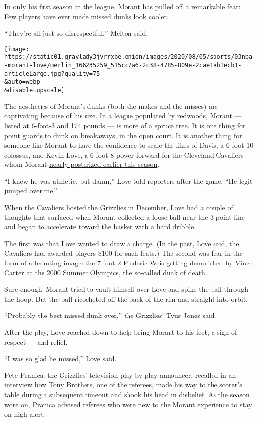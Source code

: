 In only his first season in the league, Morant has pulled off a
remarkable feat: Few players have ever made missed dunks look cooler.

``They're all just so disrespectful,'' Melton said.

\texttt{[image: https://static01.graylady3jvrrxbe.onion/images/2020/08/05/sports/03nba-morant-love/merlin\_166235259\_515cc7a6-2c38-4785-809e-2cae1eb1ecb1-articleLarge.jpg?quality=75\\\&auto=webp\\\&disable=upscale]}

The aesthetics of Morant's dunks (both the makes and the misses) are
captivating because of his size. In a league populated by redwoods,
Morant --- listed at 6-foot-3 and 174 pounds --- is more of a spruce
tree. It is one thing for point guards to dunk on breakaways, in the
open court. It is another thing for someone like Morant to have the
confidence to scale the likes of Davis, a 6-foot-10 colossus, and Kevin
Love, a 6-foot-8 power forward for the Cleveland Cavaliers whom Morant
\href{https://www.youtube.com/watch?v=SJvHeuCLJAs}{nearly posterized
earlier this season}.

``I knew he was athletic, but damn,'' Love told reporters after the
game. ``He legit jumped over me.''

When the Cavaliers hosted the Grizzlies in December, Love had a couple
of thoughts that surfaced when Morant collected a loose ball near the
3-point line and began to accelerate toward the basket with a hard
dribble.

The first was that Love wanted to draw a charge. (In the past, Love
said, the Cavaliers had awarded players \$100 for such feats.) The
second was fear in the form of a haunting image: the 7-foot-2
\href{https://www.youtube.com/watch?v=k_uZeCymShQ}{Frederic Weis getting
demolished by Vince Carter} at the 2000 Summer Olympics, the so-called
dunk of death.

Sure enough, Morant tried to vault himself over Love and spike the ball
through the hoop. But the ball ricocheted off the back of the rim and
straight into orbit.

``Probably the best missed dunk ever,'' the Grizzlies' Tyus Jones said.

After the play, Love reached down to help bring Morant to his feet, a
sign of respect --- and relief.

``I was so glad he missed,'' Love said.

Pete Pranica, the Grizzlies' television play-by-play announcer, recalled
in an interview how Tony Brothers, one of the referees, made his way to
the scorer's table during a subsequent timeout and shook his head in
disbelief. As the season wore on, Pranica advised referees who were new
to the Morant experience to stay on high alert.

